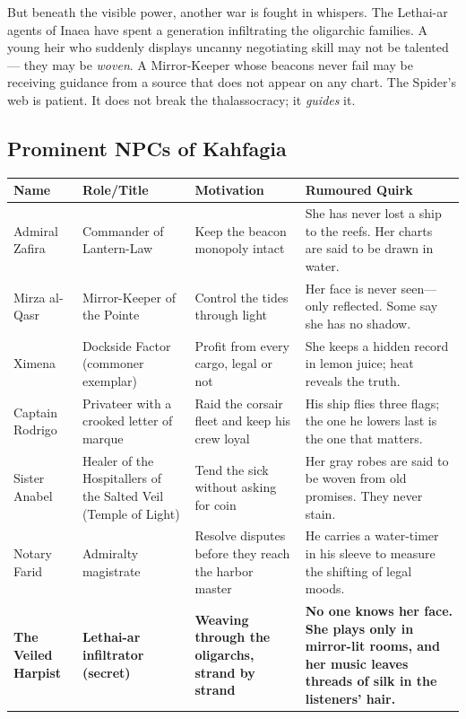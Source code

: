But beneath the visible power, another war is fought in whispers. The Lethai-ar agents of Inaea have spent a generation infiltrating the oligarchic families. A young heir who suddenly displays uncanny negotiating skill may not be talented --- they may be \emph{woven}. A Mirror-Keeper whose beacons never fail may be receiving guidance from a source that does not appear on any chart. The Spider's web is patient. It does not break the thalassocracy; it \emph{guides} it.

\subsection*{Prominent NPCs of Kahfagia}
\label{sec:kahfagia-npcs}

\begin{longtable}{|p{}|p{}|p{}|p{}|}
\hline
\textbf{Name} & \textbf{Role/Title} & \textbf{Motivation} & \textbf{Rumoured Quirk} \\
\hline
Admiral Zafira & Commander of Lantern-Law & Keep the beacon monopoly intact & She has never lost a ship to the reefs. Her charts are said to be drawn in water. \\
\hline
Mirza al-Qasr & Mirror-Keeper of the Pointe & Control the tides through light & Her face is never seen---only reflected. Some say she has no shadow. \\
\hline
Ximena & Dockside Factor (commoner exemplar) & Profit from every cargo, legal or not & She keeps a hidden record in lemon juice; heat reveals the truth. \\
\hline
Captain Rodrigo & Privateer with a crooked letter of marque & Raid the corsair fleet and keep his crew loyal & His ship flies three flags; the one he lowers last is the one that matters. \\
\hline
Sister Anabel & Healer of the Hospitallers of the Salted Veil (Temple of Light) & Tend the sick without asking for coin & Her gray robes are said to be woven from old promises. They never stain. \\
\hline
Notary Farid & Admiralty magistrate & Resolve disputes before they reach the harbor master & He carries a water-timer in his sleeve to measure the shifting of legal moods. \\
\hline
\textbf{The Veiled Harpist} & \textbf{Lethai-ar infiltrator (secret)} & \textbf{Weaving through the oligarchs, strand by strand} & \textbf{No one knows her face. She plays only in mirror-lit rooms, and her music leaves threads of silk in the listeners' hair.} \\
\hline
\end{longtable}

